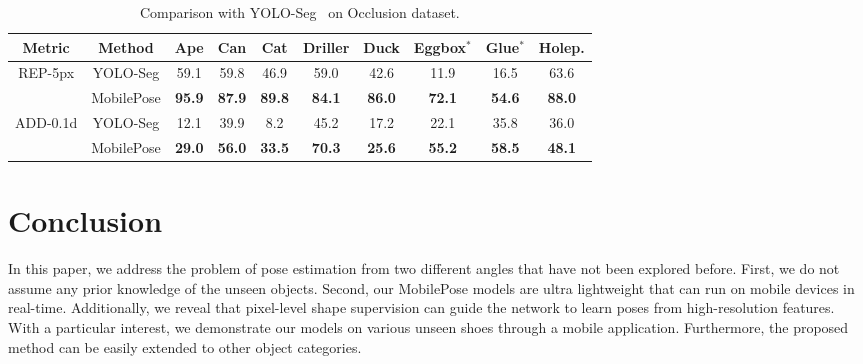 \documentclass[runningheads]{llncs}
\begin{document}
\begin{table}[t]
\begin{center}
\vspace{-0.5cm}
\begin{tabular}{c|c||c|c|c|c|c|c|c|c}\hline
Metric & Method & Ape & Can & Cat & Driller & Duck & Eggbox$^*$ & Glue$^*$ & Holep.\\
\hline
\multirow{2}{*}{REP-5px} &
YOLO-Seg & 59.1 & 59.8 & 46.9 & 59.0 & 42.6 & 11.9 & 16.5 & 63.6 \\
&MobilePose & \textbf{95.9} & \textbf{87.9} & \textbf{89.8} & \textbf{84.1} & \textbf{86.0} & \textbf{72.1} & \textbf{54.6} & \textbf{88.0}\\
\hline
\multirow{2}{*}{ADD-0.1d} &
YOLO-Seg & 12.1 & 39.9 & 8.2 & 45.2 & 17.2 & 22.1 & 35.8 & 36.0 \\
&MobilePose & \textbf{29.0} & \textbf{56.0} & \textbf{33.5} & \textbf{70.3} & \textbf{25.6} & \textbf{55.2} & \textbf{58.5} & \textbf{48.1} \\
\hline
\end{tabular}
\caption{Comparison with YOLO-Seg~\cite{Hu_2019_Segmentation} on Occlusion dataset.}
\label{tab:occlusion}
\end{center}
\end{table}

\section{Conclusion}
In this paper, we address the problem of pose estimation from two different angles that have not been explored before. First, we do not assume any prior knowledge of the unseen objects. Second, our MobilePose models are ultra lightweight that can run on mobile devices in real-time. Additionally, we reveal that pixel-level shape supervision can guide the network to learn poses from high-resolution features. With a particular interest, we demonstrate our models on various unseen shoes through a mobile application. Furthermore, the proposed method can be easily extended to other object categories.
\end{document}
